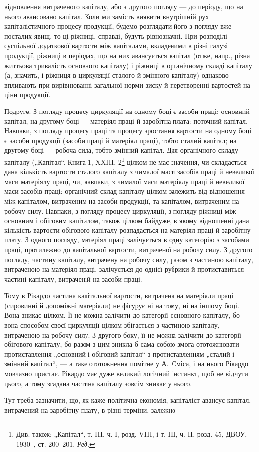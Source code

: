 \parcont{}  %
відновлення витраченого капіталу, або з другого погляду — до періоду,
що на нього авансовано капітал. Коли ми замість виявити внутрішній
рух капіталістичного процесу продукції, будемо розглядати його з погляду
вже посталих явищ, то ці ріжниці, справді, будуть рівнозначні. При
розподілі суспільної додаткової вартости між капіталами, вкладеними
в різні галузі продукції, ріжниці в періодах, що на них авансується
капітал (отже, напр., різна життьова тривалість основного капіталу) і
ріжниці в органічному складі капіталу (а, значить, і ріжниця в циркуляції
сталого й змінного капіталу) однаково впливають при вирівнюванні загальної
норми зиску й перетворенні вартостей на ціни продукції.

Подруге. З погляду процесу циркуляції на одному боці є засоби
праці: основний капітал, на другому боці — матеріял праці й заробітна
плата: поточний капітал. Навпаки, з погляду процесу праці та процесу
зростання вартости на одному боці є засоби продукції (засоби праці й
матеріял праці), тобто сталий капітал; на другому боці — робоча сила, тобто
змінний капітал. Для органічного складу капіталу („Капітал“. Книга 1,
XXIII, 2\footnote*{
Див. також: „Капітал“, т. III, ч. І, розд. VIII, і т. III, ч. II, розд. 45, ДВОУ,
1930~, ст. 200--201. \emph{Ред.}
} цілком не має значення, чи складається дана кількість вартости
сталого капіталу з чималої маси засобів праці й невеликої маси
матеріялу праці, чи, навпаки, з чималої маси матеріялу праці й невеликої
маси засобів праці: органічний склад капіталу цілком залежить від відношення
між капіталом, витраченим на засоби продукції, та капіталом, витраченим
на робочу силу. Навпаки, з погляду процесу циркуляції, з погляду
ріжниці між основним і обіговим капіталом, також цілком байдуже,
в якому відношенні дана кількість вартости обігового капіталу розпадається
на матеріял праці й заробітну плату. З одного погляду, матеріял
праці залічується в одну категорію з засобами праці, протилежно до
капітальної вартости, витраченої на робочу силу. З другого погляду,
частину капіталу, витрачену на робочу силу, разом з частиною капіталу,
витраченою на матеріял праці, залічується до однієї рубрики й протиставиться
частині капіталу, витраченій на засоби праці.

Тому в Рікардо частина капітальної вартости, витрачена на матеріяли
праці (сировинні й допоміжні матеріяли) не фігурує ні на тому, ні на іншому
боці. Вона зникає цілком. Її не можна залічити до категорії основного
капіталу, бо вона способом своєї циркуляції цілком збігається
з частиною капіталу, витраченою на робочу силу. З другого боку, її не
можна залічити до категорії обігового капіталу, бо разом з цим зникла
б сама собою змога ототожнювати протиставлення „основний і обіговий
капітал“ з протиставленням „сталий і змінний капітал“, — а таке ототожнення
помітне у А.~Сміса, і на нього Рікардо мовчазно пристає. Рікардо
має дуже великий логічний інстинкт, щоб не відчути цього, а тому згадана
частина капіталу зовсім зникає у нього.

Тут треба зазначити, що, як каже політична економія, капіталіст
авансує капітал, витрачений на заробітну плату, в різні терміни, залежно
\parbreak{}  %
